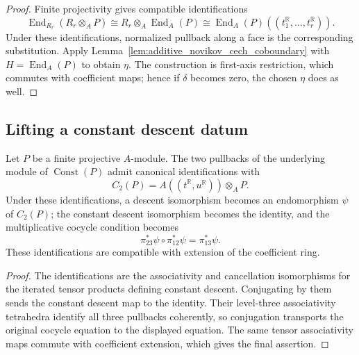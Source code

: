 \begin{proof}
  \leanok
  Finite projectivity gives compatible identifications
  \[
    \operatorname{End}_{R_r}(R_r\otimes_A P)
      \cong R_r\otimes_A\operatorname{End}_A(P)
      \cong \operatorname{End}_A(P)((t_1^{\mathbb{R}},\ldots,t_r^{\mathbb{R}})).
  \]
  Under these identifications, normalized pullback along a face is the
  corresponding substitution.  Apply
  Lemma~\ref{lem:additive_novikov_cech_coboundary} with
  $H=\operatorname{End}_A(P)$ to obtain $\eta$.  The construction
  is first-axis restriction, which commutes with coefficient maps; hence if
  $\delta$ becomes zero, the chosen $\eta$ does as well.
\end{proof}

\subsection{Lifting a constant descent datum}

\begin{lemma}
  \label{lem:normalized_constant_descent}
  \leanok
  Let $P$ be a finite projective $A$-module.  The two pullbacks of the
  underlying module of $\operatorname{Const}(P)$ admit canonical
  identifications with
  \[
    C_2(P)=A((t^{\mathbb{R}},u^{\mathbb{R}}))\otimes_A P.
  \]
  Under these identifications, a descent isomorphism becomes an endomorphism
  $\psi$ of $C_2(P)$; the constant descent isomorphism becomes the identity,
  and the multiplicative cocycle condition becomes
  \[
    \pi_{23}^\ast\psi\circ\pi_{12}^\ast\psi=\pi_{13}^\ast\psi.
  \]
  These identifications are compatible with extension of the coefficient ring.
\end{lemma}

\begin{proof}
  \leanok
  The identifications are the associativity and cancellation isomorphisms for
  the iterated tensor products defining constant descent.  Conjugating by
  them sends the constant descent map to the identity.  Their level-three
  associativity tetrahedra identify all three pullbacks coherently, so
  conjugation transports the original cocycle equation to the displayed
  equation.  The same tensor associativity maps commute with coefficient
  extension, which gives the final assertion.
\end{proof}

